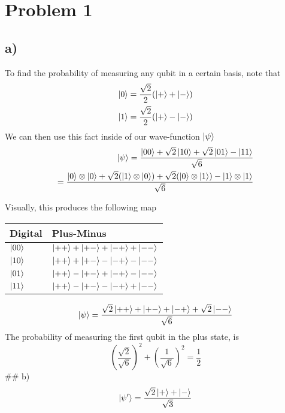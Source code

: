 \documentclass[]{article}
\begin{document}

\hypertarget{problem-1}{%
\section{Problem 1}\label{problem-1}}

\hypertarget{a}{%
\subsection{a)}\label{a}}

To find the probability of measuring any qubit in a certain basis, note
that \[
\begin{align}
\ket{0}  = \frac{\sqrt{ 2 }}{2}(\ket{+} +\ket{-}) \\
\ket{1}  = \frac{\sqrt{ 2 }}{2}(\ket{+} -\ket{-}  )
\end{align}
\] We can then use this fact inside of our wave-function \(\ket{\psi}\)
\[
\begin{align}
\ket{\psi} = \frac{{\ket{00} +\sqrt{ 2 }\ket{10} +\sqrt{ 2 }\ket{01} - \ket{11} }}{\sqrt{ 6 }} \\
 = \frac{{\ket{0}\otimes \ket{0}  +\sqrt{ 2 }(\ket{1}\otimes \ket{0})  +\sqrt{ 2 }(\ket{0}\otimes \ket{1})  - \ket{1}\otimes \ket{1}  }}{\sqrt{ 6 }} 
\end{align}
\]

Visually, this produces the following map

\begin{longtable}[]{@{}ll@{}}
\toprule\noalign{}
Digital & Plus-Minus \\
\midrule\noalign{}
\endhead
\bottomrule\noalign{}
\endlastfoot
\(\ket{00}\) & \(\ket{++}+\ket{+ -} +\ket{- +}+\ket{--}\) \\
\(\ket{10}\) & \(\ket{++}+\ket{+ -}-\ket{- +}-\ket{--}\) \\
\(\ket{01}\) & \(\ket{++}-\ket{+ -}+\ket{- +}-\ket{--}\) \\
\(\ket{11}\) & \(\ket{++}-\ket{+ -} -\ket{- +}+\ket{--}\) \\
\end{longtable}

\[
\begin{align}
\ket{\psi}  = \frac{\sqrt{ 2 }  \ket{++}+\ket{+-}+\ket{-+}+ \sqrt{ 2 }  \ket{--}   }{\sqrt{ 6 }}
\end{align}
\] The probability of measuring the first qubit in the plus state, is\\
\[
\left( \frac{\sqrt{ 2 }}{\sqrt{ 6 }} \right)^{2}+\left( \frac{1}{\sqrt{ 6 }} \right)^{2} = \frac{1}{2}
\] \#\# b) \[
\ket{\psi'}  = \frac{\sqrt{ 2 }\ket{+} +\ket{-} }{\sqrt{ 3 }} 
\]
\end{document}
